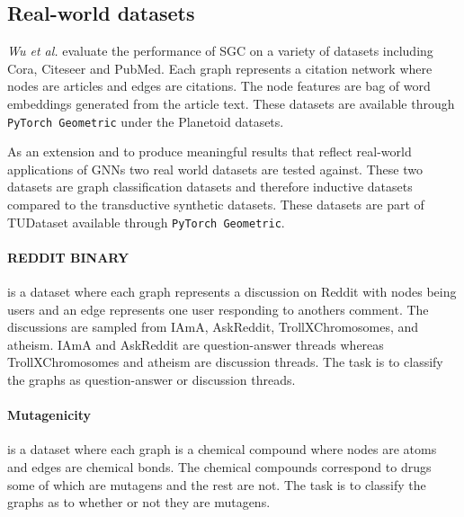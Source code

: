 \subsection{Real-world datasets}
\label{sec:RWD}


\textit{Wu et al.}\cite{wu2019simplifying} evaluate the performance of SGC on a variety of datasets including Cora, Citeseer and PubMed\cite{citation}.
Each graph represents a citation network where nodes are articles and edges are citations.
The node features are bag of word embeddings generated from the article text.
These datasets are available through \texttt{PyTorch Geometric}\cite{Fey/Lenssen/2019} under the Planetoid\cite{planetoid} datasets.

As an extension and to produce meaningful results that reflect real-world applications of GNNs two real world datasets are tested against.
These two datasets are graph classification datasets and therefore inductive datasets compared to the transductive synthetic datasets.
These datasets are part of TUDataset \cite{Morris+2020} available through \texttt{PyTorch Geometric}\cite{Fey/Lenssen/2019}.

\paragraph{REDDIT BINARY}
is a dataset where each graph represents a discussion on Reddit with nodes being users and an edge represents one user responding to anothers comment.
The discussions are sampled from IAmA, AskReddit, TrollXChromosomes, and atheism.
IAmA and AskReddit are question-answer threads whereas TrollXChromosomes and atheism are discussion threads.
The task is to classify the graphs as question-answer or discussion threads.

\paragraph{Mutagenicity}
is a dataset where each graph is a chemical compound where nodes are atoms and edges are chemical bonds.
The chemical compounds correspond to drugs some of which are mutagens and the rest are not.
The task is to classify the graphs as to whether or not they are mutagens.

